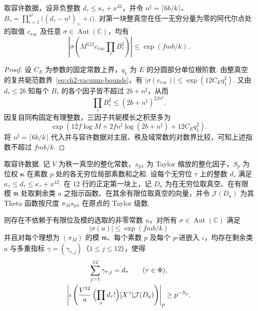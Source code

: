 \begin{lemma}[导数共同缩放因子的共轭模界]
\label{lem:c-derivative-height}
\emitthmsource
取容许数据，设非负整数 $d_\tau\le\kappa_\tau+x^{42}$，并令 $n^\sharp=\lceil6b/k\rceil$、$B_\tau=\prod_{i=1}^{n^\sharp}\bigl((d_\tau-n^\sharp)_++i\bigr)$. 对第一块整真空在任一无穷分量为零的阿代尔点处的取值 $c_{\mathrm{vac}}$ 及任意 $\sigma\in\operatorname{Aut}(\mathbb C)$，均有
\[
 \left|\sigma\left(M^{12f}c_{\mathrm{vac}}\prod_\tau B_\tau^2\right)\right|
       \le\exp(fmb/k).
\]
\end{lemma}

\begin{proof}
设 $C_E$ 为参数的固定常数上界，$q_1$ 为 $E$ 的分圆部分单位根阶数. 由整真空的复共轭范数界~\eqref{eq:ch2-vacuum-bounds}，有 $|\sigma(c_{\mathrm{vac}})|\le\exp(12C_E q_1^2)$. 又由 $d_\tau\le2b$ 知每个 $B_\tau$ 的各个因子皆不超过 $2b+n^\sharp$，从而
\[
 \prod_\tau B_\tau^2\le(2b+n^\sharp)^{2f n^\sharp}.
\]
因复自同构固定有理整数，三因子共轭模长之积至多为
\[
 \exp\left(12f\log M+2f n^\sharp\log(2b+n^\sharp)+12 C_E q_1^2\right).
\]
将 $n^\sharp=\lceil6b/k\rceil$ 代入并与容许数据对主层、秩及域常数的对数界比较，可知上述指数不超过 $fmb/k$.
\end{proof}

\begin{lemma}[第一块导数系数的有限位下界]
\label{lem:c-derivative-sharpness}
\label{thm:ch2-sharpness}
\emitthmsource
取容许数据. 记 $V$ 为秩一真空的整化常数，$s_{\mathrm{jet}}$ 为 Taylor 缩放的整化因子，$S_p$ 为位权 $\boldsymbol\kappa$ 在素数 $p$ 处的各无穷位局部素数和之和. 设每个无穷位 $\tau$ 上的整数 $d_\tau$ 满足 $\kappa_\tau\le d_\tau\le\kappa_\tau+x^{42}$. 在 $12$ 行的正定第一块上，记 $D_a$ 为在无穷位取真空、在有限模 $\mathfrak m$ 处取剩余类 $a$ 之指示函数、在其余有限位取真空的向量，并令 $\mathcal J(D_a)$ 为其 Theta 函数按尺度 $\pi_M s_{\mathrm{jet}}$ 在原点的 Taylor 级数.

则存在不依赖于有限位及模的选取的非零常数 $u$，对所有 $\sigma\in\operatorname{Aut}(\mathbb C)$ 满足
\[
     |\sigma(u)|\le \exp(fmb/k)
\]
并且对每个理想为 $(\pi_M)$ 的模 $\mathfrak m$、每个素数 $p$ 及每个 $p$-进嵌入 $\iota$，均存在剩余类 $a$ 与多重指标 $\gamma=(\gamma_{\tau,j})$（$1\le j\le12$），使得
\begin{equation}
\label{eq:ch2-sharpness}
\begin{gathered}
 \sum_{j=1}^{12}\gamma_{\tau,j}=d_\tau\qquad(\tau\in\Phi),\\
 \left|\iota\left(\frac{V^{12}}{u}\,
       \Bigl(\prod_\tau d_\tau!\Bigr)
       [X^\gamma]\mathcal J(D_a)\right)\right|_p
 \ge p^{-S_p}.
\end{gathered}
\end{equation}
\end{lemma}

